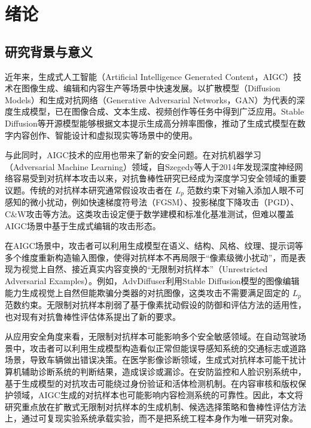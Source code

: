 \documentclass[type=bachelor,oneside]{fduthesis}
\begin{document}
\chapter{绪论}
\label{chap:intro}

\section{研究背景与意义}

近年来，生成式人工智能（Artificial Intelligence Generated Content，AIGC）技术在图像生成、编辑和内容生产等场景中快速发展。以扩散模型（Diffusion Models）\cite{ho2020denoising}和生成对抗网络（Generative Adversarial Networks，GAN）为代表的深度生成模型，已在图像合成\cite{rombach2022highresolution}、文本生成、视频创作等任务中得到广泛应用。Stable Diffusion\cite{rombach2022highresolution}等开源模型能够根据文本提示生成高分辨率图像，推动了生成式模型在数字内容创作、智能设计和虚拟现实等场景中的使用。

与此同时，AIGC技术的应用也带来了新的安全问题。在对抗机器学习（Adversarial Machine Learning）领域，自Szegedy等人\cite{szegedy2014intriguing}于2014年发现深度神经网络容易受到对抗样本攻击以来，对抗鲁棒性研究已经成为深度学习安全领域的重要议题。传统的对抗样本研究通常假设攻击者在 $L_p$ 范数约束下对输入添加人眼不可感知的微小扰动，例如快速梯度符号法（FGSM）\cite{goodfellow2015explaining}、投影梯度下降攻击（PGD）\cite{madry2018towards}、C\&W攻击\cite{carlini2017towards}等方法。这类攻击设定便于数学建模和标准化基准测试，但难以覆盖AIGC场景中基于生成式编辑的攻击形态。

在AIGC场景中，攻击者可以利用生成模型在语义、结构、风格、纹理、提示词等多个维度重新构造输入图像，使得对抗样本不再局限于“像素级微小扰动”，而是表现为视觉上自然、接近真实内容变换的“无限制对抗样本”（Unrestricted Adversarial Examples）\cite{brown2018unrestricted,song2018constructing}。例如，AdvDiffuser\cite{chen2023advdiffuser}利用Stable Diffusion模型的图像编辑能力生成视觉上自然但能欺骗分类器的对抗图像，这类攻击不需要满足固定的 $L_p$ 范数约束。无限制对抗样本削弱了基于像素扰动假设的防御和评估方法的适用性，也对现有对抗鲁棒性评估体系提出了新的要求。

从应用安全角度来看，无限制对抗样本可能影响多个安全敏感领域。在自动驾驶场景中，攻击者可以利用生成模型构造看似正常但能误导感知系统的交通标志或道路场景，导致车辆做出错误决策。在医学影像诊断领域，生成式对抗样本可能干扰计算机辅助诊断系统的判断结果，造成误诊或漏诊。在安防监控和人脸识别系统中，基于生成模型的对抗攻击可能绕过身份验证和活体检测机制。在内容审核和版权保护领域，AIGC生成的对抗样本也可能影响内容检测系统的可靠性。因此，本文将研究重点放在扩散式无限制对抗样本的生成机制、候选选择策略和鲁棒性评估方法上，通过可复现实验系统承载实验，而不是把系统工程本身作为唯一研究对象。
\end{document}
